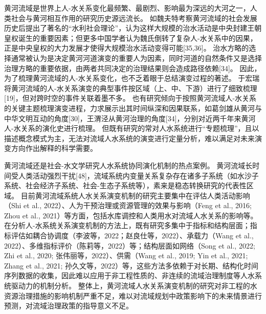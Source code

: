 
黄河流域是世界上人-水关系变化最频繁、最剧烈、影响最为深远的大河之一，人类社会与黄河相互作用的研究历史源远流长。
如魏夫特考察黄河流域的社会发展历史后提出了著名的“水利社会理论”，认为这样大规模的治水活动是中央封建王朝皇权诞生的重要因素；但更多中国学者认为魏氏倒转了复杂人-水关系中的因果，正是中央皇权的大力发展才使得大规模治水活动变得可能[35,36]。
治水方略的选择通常被认为是决定黄河河道演变的重要人为因素，同时河道的自然条件又是选择治理方略的重要依据，由两者共同决定的治理结果则会造成路径依赖[34]。
因此，为了梳理黄河流域的人-水关系变化，也不乏着眼于总结演变过程的著述。
于宏瑞将黄河流域的人-水关系演变的典型事件按区域（上、中、下游）进行了细致梳理[19]，但对跨时空的事件关联着墨不多。
也有研究倾向于按照黄河流域人-水关系的关键主题梳理演变进程，力求展示出其时间纵深和因果联系，如葛剑雄从黄河与中华文明互动的角度[30]，王渭泾从黄河治理的角度[34]，分别对近两千年来黄河人-水关系的演化史进行梳理。
但既有研究的常对人水系统进行“专题梳理”，且以描述概念模式为主，无法对流域人水系统的演变进行定量分析，难以满足对未来演变方向作出解释的科学需要。

黄河流域还是社会-水文学研究人水系统协同演化机制的热点案例。
黄河流域长时间受人类活动强烈干扰[48]，流域系统内变量关系复杂存在诸多子系统（如水沙子系统、社会经济子系统、社会-生态子系统等），素来是稳态转换研究的代表性区域。
目前黄河流域系统人水关系演变机制的研究主要集中在评估人类活动影响（Shi et al., 2022）、人为干预治理或资源管理的效果与影响（Feng et al., 2016; Zhou et al., 2021）等方面，包括水库调控和人类用水对流域人水关系的影响等\cite{wang2019c}。
在分析人-水系统关系演变机制的方法上，既有研究多集中于指标和结构层面；指标评估如耦合协调度（李波等，2022；赵良仕等，2022）、承载力（Wang et al., 2022）、多维指标评价（陈莉等，2022）等；结构层面如网络（Song et al., 2022; Zhi et al., 2020; 张伟丽等，2022）、供需（Wang et al., 2019; Yin et al., 2021; Zhang et al., 2021; 孙久文等，2022）等，这些方法多依赖于对长期、结构化时间序列数据的收集，因此难以应用于非工程性质的、非连续的流域治理制度等人水系统驱动力的机制分析。
整体上，黄河流域人水关系演变机制的研究对非工程的水资源治理措施的影响机制严重不足，难以对流域规划中政策影响下的未来情景进行预测，对流域治理政策的指导意义不足。

